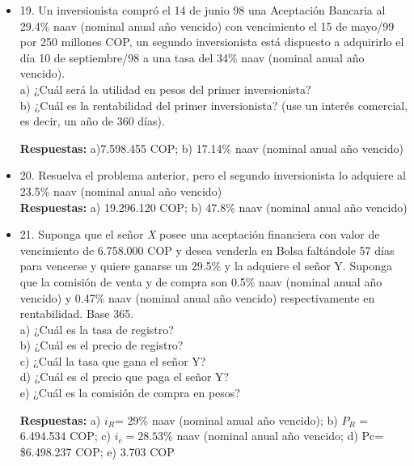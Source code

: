 \begin{itemize}
 \item 19. Un inversionista compró el 14 de junio 98 una Aceptación Bancaria al 29.4\% naav (nominal anual año vencido) con vencimiento el 15 de mayo/99 por 250 millones COP, un segundo inversionista está dispuesto a adquirirlo el día 10 de septiembre/98 a una tasa del 34\% naav (nominal anual año vencido).\\
       a) ¿Cuál será la utilidad en pesos del primer inversionista?\\
       b) ¿Cuál es la rentabilidad del primer inversionista? (use un interés comercial, es decir, un año de 360 días).
       
       \textbf{Respuestas:} a)7.598.455 COP; b) 17.14\% naav (nominal anual año vencido)\\
       \medskip

 \item 20. Resuelva el problema anterior, pero el segundo inversionista lo adquiere al 23.5\% naav (nominal anual año vencido)\\
       \textbf{Respuestas:} a) 19.296.120 COP; b) 47.8\% naav (nominal anual año vencido)\\
       \medskip

 \item 21. Suponga que el señor \textit{X} posee una aceptación financiera con valor de vencimiento de 6.758.000 COP y desea venderla en Bolsa faltándole 57 días para vencerse y quiere ganarse un 29.5\% y la adquiere el señor Y. Suponga que la comisión de venta y de compra son 0.5\% naav (nominal anual año vencido) y 0.47\% naav (nominal anual año vencido) respectivamente en rentabilidad. Base 365.\\
       a) ¿Cuál es la tasa de registro?\\
       b) ¿Cuál es el precio de registro?\\
       c) ¿Cuál la tasa que gana el señor Y?\\
       d) ¿Cuál es el precio que paga el señor Y?\\
       e) ¿Cuál es la comisión de compra en pesos?
       
       \textbf{Respuestas:} a) $i_{R}$= 29\% naav (nominal anual año vencido); b) $P_{R}$ = 6.494.534 COP; c) $i_{c} = 28.53\%$ naav (nominal anual año vencido; d) Pc= \$6.498.237 COP; e) 3.703 COP\\
       \medskip


\end{itemize}

